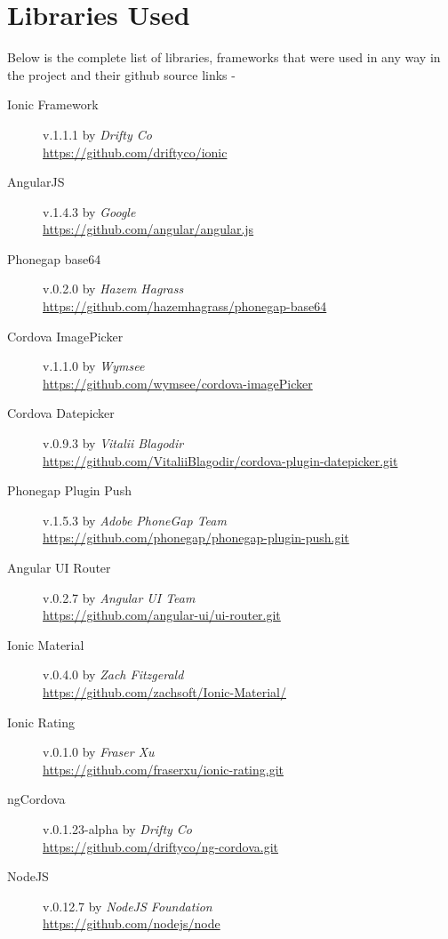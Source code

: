 \chapter{Libraries Used}
\label{appendix:libs}

\newcommand{\link}[1]{\url{#1}}

Below is the complete list of libraries, frameworks that were used in any way in the project and their github source links - 

\begin{description}
	\item [Ionic Framework] v.1.1.1 by \textit{Drifty Co} \\ \link{https://github.com/driftyco/ionic}
	\item [AngularJS] v.1.4.3 by \textit{Google} \\ \link{https://github.com/angular/angular.js}
	\item [Phonegap base64] v.0.2.0 by \textit{Hazem Hagrass} \\ \link{https://github.com/hazemhagrass/phonegap-base64}
	\item [Cordova ImagePicker] v.1.1.0 by \textit{Wymsee} \\ \link{https://github.com/wymsee/cordova-imagePicker}
	\item [Cordova Datepicker] v.0.9.3 by \textit{Vitalii Blagodir} \\ \link{https://github.com/VitaliiBlagodir/cordova-plugin-datepicker.git}
	\item [Phonegap Plugin Push] v.1.5.3 by \textit{Adobe PhoneGap Team} \\ \link{https://github.com/phonegap/phonegap-plugin-push.git}
	\item [Angular UI Router] v.0.2.7 by \textit{Angular UI Team} \\ \link{https://github.com/angular-ui/ui-router.git}
	\item [Ionic Material] v.0.4.0 by \textit{Zach Fitzgerald} \\ \link{https://github.com/zachsoft/Ionic-Material/}
	\item [Ionic Rating] v.0.1.0 by \textit{Fraser Xu} \\ \link{https://github.com/fraserxu/ionic-rating.git}
	\item [ngCordova] v.0.1.23-alpha by \textit{Drifty Co} \\ \link{https://github.com/driftyco/ng-cordova.git}
	\item [NodeJS] v.0.12.7 by \textit{NodeJS Foundation} \\ \link{https://github.com/nodejs/node}

\end{description}
